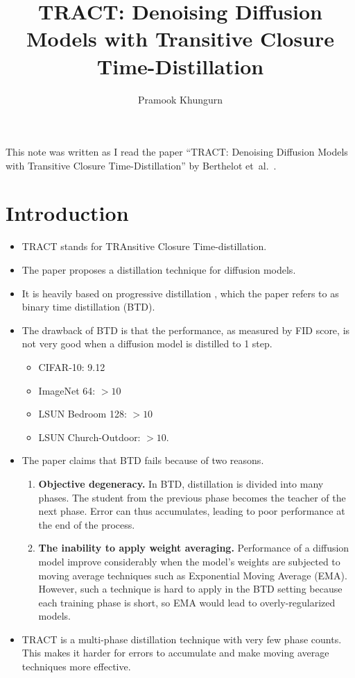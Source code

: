 \documentclass[10pt]{article}
\title{TRACT: Denoising Diffusion Models with Transitive Closure Time-Distillation}
\author{Pramook Khungurn}
\newcommand{\etal}{{et~al.}}
\begin{document}
\maketitle

This note was written as I read the paper ``TRACT: Denoising Diffusion Models with Transitive Closure Time-Distillation'' by Berthelot \etal~\cite{Berthelot:2023}.

\section{Introduction}

\begin{itemize}
  \item TRACT stands for TRAnsitive Closure Time-distillation.
  
  \item The paper proposes a distillation technique for diffusion models. 
  
  \item It is heavily based on progressive distillation \cite{Salimans:2022}, which the paper refers to as binary time distillation (BTD).
  
  \item The drawback of BTD is that the performance, as measured by FID score, is not very good when a diffusion model is distilled to 1 step.
  \begin{itemize}
    \item CIFAR-10: 9.12
    \item ImageNet 64: $>10$
    \item LSUN Bedroom 128: $>10$
    \item LSUN Church-Outdoor: $>10$.
  \end{itemize}

  \item The paper claims that BTD fails because of two reasons.
  \begin{enumerate}
    \item {\bf Objective degeneracy.} In BTD, distillation is divided into many phases. The student from the previous phase becomes the teacher of the next phase. Error can thus accumulates, leading to poor performance at the end of the process.
    
    \item {\bf The inability to apply weight averaging.} Performance of a diffusion model improve considerably when the model's weights are subjected to moving average techniques such as Exponential Moving Average (EMA). However, such a technique is hard to apply in the BTD setting because each training phase is short, so EMA would lead to overly-regularized models.
  \end{enumerate}

  \item TRACT is a multi-phase distillation technique with very few phase counts. This makes it harder for errors to accumulate and make moving average techniques more effective.
\end{itemize}
\end{document}
